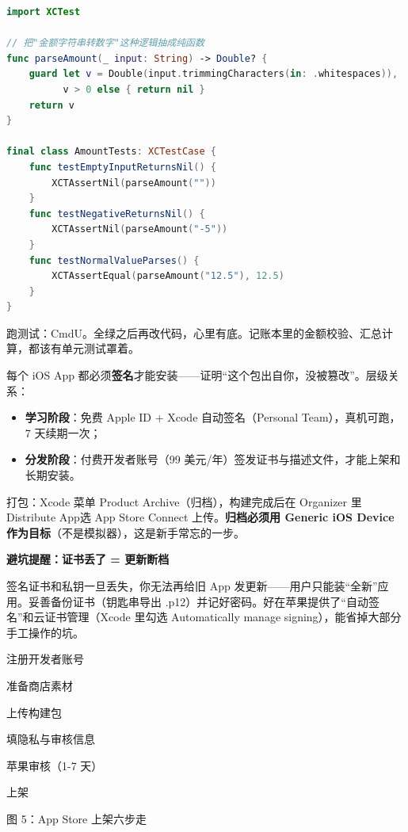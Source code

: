 \begin{lstlisting}[language=Swift]
import XCTest

// 把"金额字符串转数字"这种逻辑抽成纯函数
func parseAmount(_ input: String) -> Double? {
    guard let v = Double(input.trimmingCharacters(in: .whitespaces)),
          v > 0 else { return nil }
    return v
}

final class AmountTests: XCTestCase {
    func testEmptyInputReturnsNil() {
        XCTAssertNil(parseAmount(""))
    }
    func testNegativeReturnsNil() {
        XCTAssertNil(parseAmount("-5"))
    }
    func testNormalValueParses() {
        XCTAssertEqual(parseAmount("12.5"), 12.5)
    }
}
\end{lstlisting}

跑测试：CmdU。全绿之后再改代码，心里有底。记账本里的金额校验、汇总计算，都该有单元测试罩着。


每个 iOS App 都必须\textbf{签名}才能安装——证明“这个包出自你，没被篡改”。层级关系：

\begin{itemize}
  \item \textbf{学习阶段}：免费 Apple ID + Xcode 自动签名（Personal Team），真机可跑，7 天续期一次；
  \item \textbf{分发阶段}：付费开发者账号（99 美元/年）签发证书与描述文件，才能上架和长期安装。
\end{itemize}

打包：Xcode 菜单 Product Archive（归档），构建完成后在 Organizer 里Distribute App选 App Store Connect 上传。\textbf{归档必须用 Generic iOS Device 作为目标}（不是模拟器），这是新手常忘的一步。

\textbf{避坑提醒：证书丢了 = 更新断档}\par

签名证书和私钥一旦丢失，你无法再给旧 App 发更新——用户只能装“全新”应用。妥善备份证书（钥匙串导出 .p12）并记好密码。好在苹果提供了“自动签名”和云证书管理（Xcode 里勾选 Automatically manage signing），能省掉大部分手工操作的坑。


注册开发者账号

准备商店素材

上传构建包

填隐私与审核信息

苹果审核（1-7 天）

上架

\begin{center}\small\color{gray}图 5：App Store 上架六步走\end{center}

